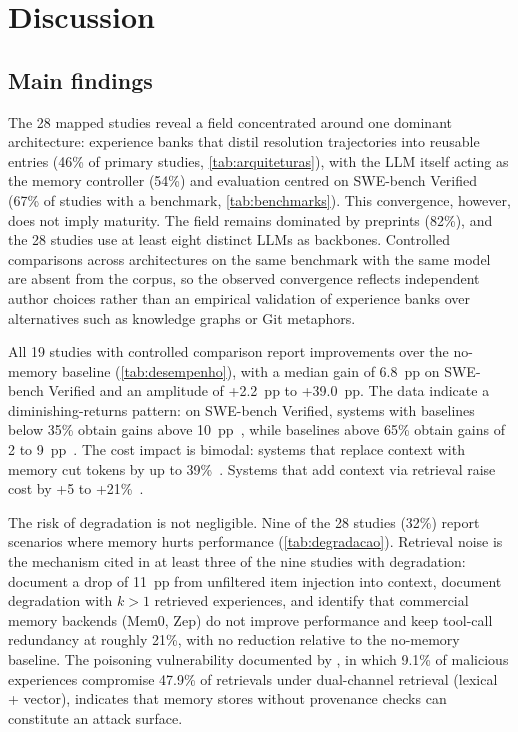 \section{Discussion}
\label{sec:discussao}


\subsection{Main findings}
\label{sec:principais-achados}

The 28 mapped studies reveal a field concentrated around one dominant
architecture: experience banks that distil resolution trajectories into
reusable entries (46\% of primary studies,
\autoref{tab:arquiteturas}), with the LLM itself acting as the memory
controller (54\%) and evaluation centred on SWE-bench Verified (67\% of
studies with a benchmark, \autoref{tab:benchmarks}).
This convergence, however, does not imply maturity.
The field remains dominated by preprints (82\%), and the 28 studies use
at least eight distinct LLMs as backbones.
Controlled comparisons across architectures on the same benchmark with
the same model are absent from the corpus, so the observed convergence
reflects independent author choices rather than an empirical validation
of experience banks over alternatives such as knowledge graphs or Git
metaphors.

All 19 studies with controlled comparison report improvements over the
no-memory baseline (\autoref{tab:desempenho}), with a median gain of
6.8~pp on SWE-bench Verified and an amplitude of +2.2~pp to +39.0~pp.
The data indicate a diminishing-returns pattern:
on SWE-bench Verified, systems with baselines below 35\% obtain gains
above
10~pp~\citep{li2026traversalaspolicy,zhang2025darwingodel},
while baselines above 65\% obtain gains of 2 to
9~pp~\citep{deng2026memcoder,wu2025gcc,chen2025sweexp}.
The cost impact is bimodal: systems that replace context with memory
cut tokens by up to
39\%~\citep{li2026traversalaspolicy}.
Systems that add context via retrieval raise cost by +5 to
+21\%~\citep{chen2025sweexp,wang2026memgovern,xia2025livesweagent}.

The risk of degradation is not negligible.
Nine of the 28 studies (32\%) report scenarios where memory hurts
performance (\autoref{tab:degradacao}).
Retrieval noise is the mechanism cited in at least three of the nine
studies with degradation:
\citet{lindenbauer2025ctimrover} document a drop of 11~pp from unfiltered
item injection into context,
\citet{chen2025sweexp} document degradation with $k > 1$ retrieved
experiences, and
\citet{deshpande2025memtrack} identify that commercial memory backends
(Mem0, Zep) do not improve performance and keep tool-call redundancy at
roughly 21\%, with no reduction relative to the no-memory baseline.
The poisoning vulnerability documented by
\citet{srivastava2025memorygraft}, in which 9.1\% of malicious
experiences compromise 47.9\% of retrievals under dual-channel
retrieval (lexical + vector), indicates that memory stores without
provenance checks can constitute an attack surface.

